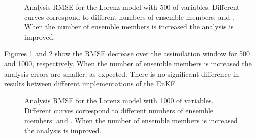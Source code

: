 \documentclass[12pt]{article}
\begin{document}
\begin{figure}[H]
\centering
\begin{sideways}  \end{sideways} 
\caption{Analysis RMSE for the Lorenz model with 500 of variables. Different curves correspond to  different numbers of ensemble members:  and . When the number of ensemble members is increased the analysis is improved. }
\label{Fig:Lorenz500-Results-Simulation}
\end{figure}


Figures  \ref{Fig:Lorenz500-Results-Simulation} and  \ref{Fig:Lorenz1000-Results-Simulation} show the RMSE decrease over the assimilation window for  500 and 1000, respectively. When the number of ensemble members is increased the analysis errors are smaller, as expected. There is no significant difference in results between different implementations of the EnKF.


\begin{figure}[H]
\centering
\begin{sideways}  \end{sideways} 
\caption{Analysis RMSE for the Lorenz model with 1000 of variables. Different curves correspond to  different numbers of ensemble members:  and . When the number of ensemble members is increased the analysis is improved. }
\label{Fig:Lorenz1000-Results-Simulation}
\end{figure}
\end{document}
